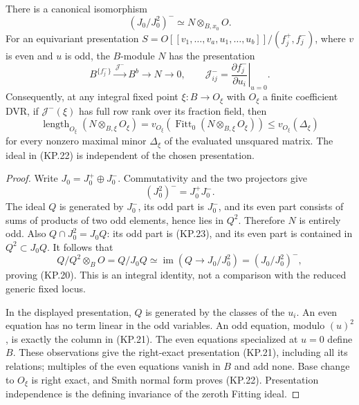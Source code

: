 \begin{lemma}
There is a canonical isomorphism
\[
       (J_0/J_0^2)^-\simeq N\otimes_{B,x_0}O.               \tag{KP.20}
\]
For an equivariant presentation
$S=O[[v_1,\ldots,v_a,u_1,\ldots,u_b]]/(f^+_j,f^-_j)$,
where $v$ is even and $u$ is odd, the $B$-module $N$ has the
presentation
\[
 B^{\{f^-_j\}}\xrightarrow{\,\mathcal J^-\,}B^b
              \longrightarrow N\longrightarrow0,
 \qquad
 \mathcal J^-_{ij}=\left.\frac{\partial f^-_j}{\partial u_i}\right|_{u=0}.
                                                                  \tag{KP.21}
\]
Consequently, at any integral fixed point
$\xi:B\to O_\xi$ with $O_\xi$ a finite coefficient DVR,
if $\mathcal J^-(\xi)$ has full row rank over its fraction
field, then
\[
 \operatorname{length}_{O_\xi}(N\otimes_{B,\xi}O_\xi)
       =v_{O_\xi}\!\left(\operatorname{Fitt}_0
                  (N\otimes_{B,\xi}O_\xi)\right)
       \leq v_{O_\xi}(\Delta_\xi)                            \tag{KP.22}
\]
for every nonzero maximal minor $\Delta_\xi$ of the evaluated
unsquared matrix.  The ideal in (KP.22) is independent of
the chosen presentation.
\end{lemma}
\begin{proof}
Write $J_0=J_0^+\oplus J_0^-$.  Commutativity and the two
projectors give
\[
              (J_0^2)^-=J_0^+J_0^- .                        \tag{KP.23}
\]
The ideal $Q$ is generated by $J_0^-$, its odd part is
$J_0^-$, and its even part consists of sums of products of
two odd elements, hence lies in $Q^2$.  Therefore $N$ is
entirely odd.  Also
$Q\cap J_0^2=J_0Q$: its odd part is (KP.23), and its even
part is contained in $Q^2\subset J_0Q$.  It follows that
\[
 Q/Q^2\otimes_B O=Q/J_0Q
       \simeq\operatorname{im}(Q\to J_0/J_0^2)
       =(J_0/J_0^2)^-,
\]
proving (KP.20).  This is an integral identity, not a
comparison with the reduced generic fixed locus.

In the displayed presentation, $Q$ is generated by the
classes of the $u_i$.  An even equation has no term linear
in the odd variables.  An odd equation, modulo $(u)^2$,
is exactly the column in (KP.21).  The even equations
specialized at $u=0$ define $B$.  These observations give
the right-exact presentation (KP.21), including all its
relations; multiples of the even equations vanish in $B$
and add none.  Base change to $O_\xi$ is right exact, and
Smith normal form proves (KP.22).  Presentation independence
is the defining invariance of the zeroth Fitting ideal.
\end{proof}

